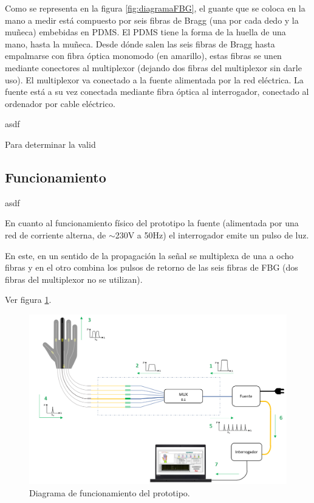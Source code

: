 \begin{itemize}
	
	Como se representa en la figura \ref{fig:diagramaFBG}, el guante que se coloca en la mano a medir está compuesto por seis fibras de Bragg (una por cada dedo y la muñeca) embebidas en PDMS. El PDMS tiene la forma de la huella de una mano, hasta la muñeca. Desde dónde salen las seis fibras de Bragg hasta empalmarse con fibra óptica monomodo (en amarillo), estas fibras se unen mediante conectores al multiplexor (dejando dos fibras del multiplexor sin darle uso). El multiplexor va conectado a la fuente alimentada por la red eléctrica. La fuente está a su vez conectada mediante fibra óptica al interrogador, conectado al ordenador por cable eléctrico.
	
	
	
	
\end{itemize}

asdf




Para determinar la valid


\subsection{Funcionamiento}
\label{sec:funcionamiento3}
asdf

En cuanto al funcionamiento físico del prototipo la fuente  (alimentada por una red de corriente alterna, de $\sim$230V a 50Hz) el interrogador emite un pulso de luz. 



En este, en un sentido de la propagación la señal se multiplexa de una a ocho fibras y en el otro combina los pulsos de retorno de las seis fibras de FBG (dos fibras del multiplexor no se utilizan). 

Ver figura \ref{fig:diagramaFBGfuncionamiento}.

\begin{figure}[H]
	\centering
	\includegraphics[width=1\textwidth]{./img/diagramaFBGfuncionamiento}
	\caption{Diagrama de funcionamiento del prototipo.} \label{fig:diagramaFBGfuncionamiento}
\end{figure}



